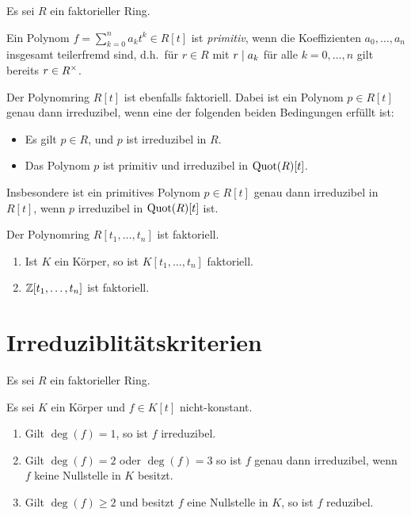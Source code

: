 Es sei $R$ ein faktorieller Ring.

\begin{definition}
  Ein Polynom $f = \sum_{k=0}^n a_k t^k \in R[t]$ ist \emph{primitiv}, wenn die Koeffizienten $a_0, \dotsc, a_n$ insgesamt teilerfremd sind, d.h.\ für $r \in R$ mit $r \mathrel{|} a_k$ für alle $k = 0, \dotsc, n$ gilt bereits $r \in R^{\times}$.
\end{definition}

\begin{theorem}
  Der Polynomring $R[t]$ ist ebenfalls faktoriell.
  Dabei ist ein Polynom $p \in R[t]$ genau dann irreduzibel, wenn eine der folgenden beiden Bedingungen erfüllt ist:
  \begin{itemize}
    \item
      Es gilt $p \in R$, und $p$ ist irreduzibel in $R$.
    \item
      Das Polynom $p$ ist primitiv und irreduzibel in $\operatorname{Quot}(R)[t]$.
  \end{itemize}
  Insbesondere ist ein primitives Polynom $p \in R[t]$ genau dann irreduzibel in $R[t]$, wenn $p$ irreduzibel in $\operatorname{Quot}(R)[t]$ ist.
\end{theorem}

\begin{corollary}
  Der Polynomring $R[t_1, \dotsc, t_n]$ ist faktoriell.
\end{corollary}

\begin{example}
  \begin{enumerate}
    \item
      Ist $K$ ein Körper, so ist $K[t_1, \dotsc, t_n]$ faktoriell.
    \item
      $\mathbb{Z}[t_1, \dotsc, t_n]$ ist faktoriell.
  \end{enumerate}
\end{example}





\section{Irreduziblitätskriterien}

Es sei $R$ ein faktorieller Ring.

\begin{lemma}
  Es sei $K$ ein Körper und $f \in K[t]$ nicht-konstant.
  \begin{enumerate}
    \item
      Gilt $\deg(f) = 1$, so ist $f$ irreduzibel.
    \item
      Gilt $\deg(f) = 2$ oder $\deg(f) = 3$ so ist $f$ genau dann irreduzibel, wenn $f$ keine Nullstelle in $K$ besitzt.
    \item
      Gilt $\deg(f) \geq 2$ und besitzt $f$ eine Nullstelle in $K$, so ist $f$ reduzibel.
  \end{enumerate}
\end{lemma}


